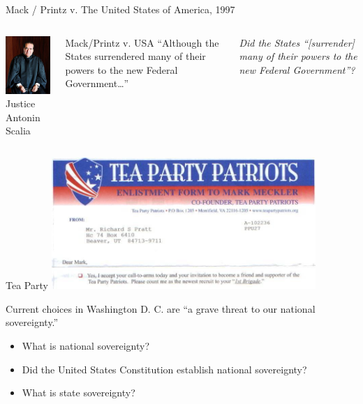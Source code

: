 \begin{frame}{Mack / Printz v. The United States of America, 1997}
    \begin{columns}[onlytextwidth]
            \centering
            \includegraphics[height=0.75\textheight]{img/scalia.jpg} \\
            Justice Antonin Scalia \\

            \begin{block}{Mack/Printz v. USA}
                ``Although the States surrendered many of their powers to the new Federal Government\ldots''
            \end{block}
            \pause
            {
                \color{red}
                \emph{Did the States ``[surrender] many of their powers to the new Federal Government''?}
            }
    \end{columns}
\end{frame}

\begin{frame}{Tea Party}
    \centering
    \includegraphics[width=0.75\textwidth]{img/tea-party.jpg} \\
    \begin{block}{}Current choices in Washington D. C. are ``a grave threat to our national sovereignty.'' \end{block}
    \begin{itemize}
        \item What is national sovereignty?
        \item Did the United States Constitution establish national sovereignty?
        \item What is state sovereignty?
    \end{itemize}
\end{frame}

